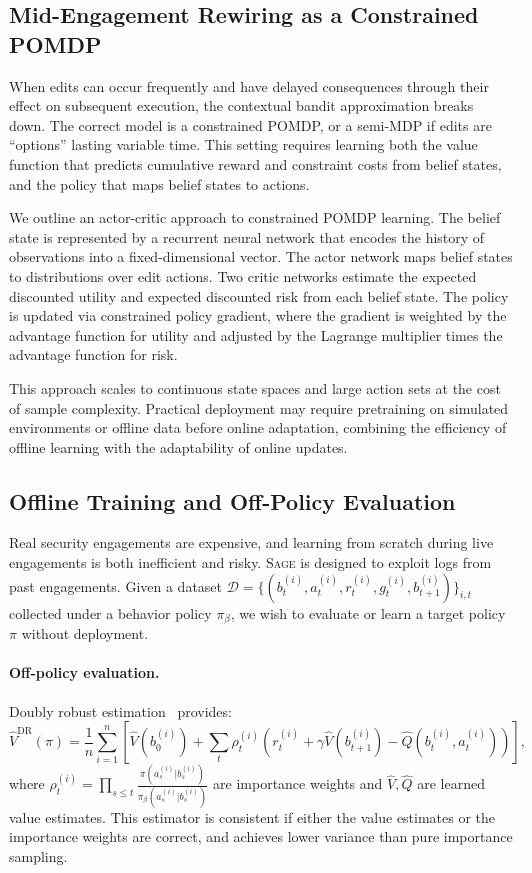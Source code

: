 \documentclass[sigconf,anonymous]{acmart}
\newcommand{\SAGE}{\textsc{Sage}\xspace}
\begin{document}
\subsection{Mid-Engagement Rewiring as a Constrained POMDP}

When edits can occur frequently and have delayed consequences through their effect on subsequent execution, the contextual bandit approximation breaks down. The correct model is a constrained POMDP, or a semi-MDP if edits are ``options'' lasting variable time. This setting requires learning both the value function that predicts cumulative reward and constraint costs from belief states, and the policy that maps belief states to actions.

We outline an actor-critic approach to constrained POMDP learning. The belief state is represented by a recurrent neural network that encodes the history of observations into a fixed-dimensional vector. The actor network maps belief states to distributions over edit actions. Two critic networks estimate the expected discounted utility and expected discounted risk from each belief state. The policy is updated via constrained policy gradient, where the gradient is weighted by the advantage function for utility and adjusted by the Lagrange multiplier times the advantage function for risk.

This approach scales to continuous state spaces and large action sets at the cost of sample complexity. Practical deployment may require pretraining on simulated environments or offline data before online adaptation, combining the efficiency of offline learning with the adaptability of online updates.

\subsection{Offline Training and Off-Policy Evaluation}

Real security engagements are expensive, and learning from scratch during live engagements is both inefficient and risky. \SAGE is designed to exploit logs from past engagements. Given a dataset $\mathcal{D} = \{(b_t^{(i)}, a_t^{(i)}, r_t^{(i)}, g_t^{(i)}, b_{t+1}^{(i)})\}_{i,t}$ collected under a behavior policy $\pi_\beta$, we wish to evaluate or learn a target policy $\pi$ without deployment.

\paragraph{Off-policy evaluation.} Doubly robust estimation~\cite{jiang2016doublyrobust} provides:
\begin{equation}
\hat{V}^{\text{DR}}(\pi) = \frac{1}{n}\sum_{i=1}^n \left[\hat{V}(b_0^{(i)}) + \sum_t \rho_t^{(i)} (r_t^{(i)} + \gamma \hat{V}(b_{t+1}^{(i)}) - \hat{Q}(b_t^{(i)}, a_t^{(i)}))\right],
\end{equation}
where $\rho_t^{(i)} = \prod_{s \le t} \frac{\pi(a_s^{(i)}|b_s^{(i)})}{\pi_\beta(a_s^{(i)}|b_s^{(i)})}$ are importance weights and $\hat{V}, \hat{Q}$ are learned value estimates. This estimator is consistent if either the value estimates or the importance weights are correct, and achieves lower variance than pure importance sampling.
\end{document}
